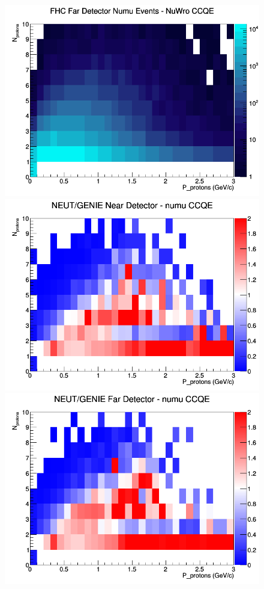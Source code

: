 \begin{figure}[h]
\endminipage
{}
\includegraphics[width=\linewidth]{N_P/nominal/protons/CCQE_FHC_FD_numu_N_P_NuWro.png}
\endminipage
\newline
{}
\includegraphics[width=\linewidth]{N_P/nominal/protons/ratios/CCQE_NEUT_GENIE_numu_near_N_P.png}
\endminipage
{}
\includegraphics[width=\linewidth]{N_P/nominal/protons/ratios/CCQE_NEUT_GENIE_numu_far_N_P.png}

\end{figure}

